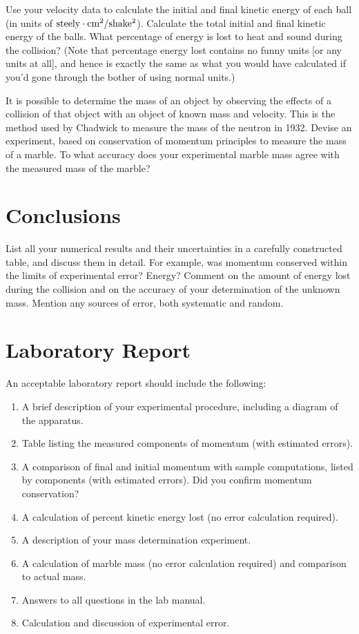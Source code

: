 Use your velocity data to calculate the initial and final kinetic
energy of each ball (in units of ${\rm steely\cdot cm^2/shake^2}$).  Calculate the total initial
and final kinetic energy of the balls.  What percentage of energy is
lost to heat and sound during the collision?  (Note that percentage energy lost
contains no funny units [or any units at all], and hence is exactly the same
as what you would have calculated if you'd gone through the bother of using normal
units.)

It is possible to determine the mass of an object by observing the
effects of a collision of that object with an object of known mass and
velocity.  This is the method used by Chadwick to measure the mass of
the neutron in 1932.  Devise an experiment, based on conservation of
momentum principles to measure the mass of a marble. %
To what accuracy does your experimental marble
mass agree with the measured mass of the marble?

\section*{Conclusions}
List all your numerical results and their uncertainties in a carefully
constructed table, and discuss them in detail.  For example, was momentum
conserved within the limits of experimental error?  Energy?
Comment on the amount of energy lost during the collision and on the
accuracy of your determination of the unknown mass.  Mention any sources of
error, both systematic and random.

\section*{Laboratory Report}
An acceptable laboratory report should include the following:
\begin{enumerate}
\item A brief description of your experimental procedure, including a diagram of the apparatus.
\item Table listing the measured components of momentum (with estimated errors).
\item A comparison of final and initial momentum with sample computations, listed by components (with estimated errors).
Did you confirm momentum conservation?
\item A calculation of percent kinetic energy lost (no error calculation required).
\item A description of your mass determination experiment.
\item A calculation of marble mass (no error calculation required) and comparison to actual mass.
\item Answers to all questions in the lab manual.
\item Calculation and discussion of experimental error.
\end{enumerate}

